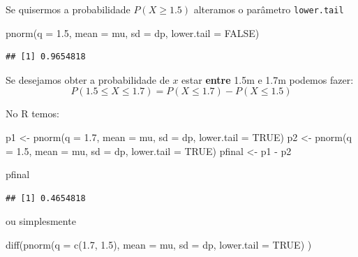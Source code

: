 \documentclass[
]{book}
\newenvironment{Shaded}{\begin{snugshade}}{\end{snugshade}}
\newcommand{\AttributeTok}[1]{\textcolor[rgb]{0.77,0.63,0.00}{#1}}
\newcommand{\ConstantTok}[1]{\textcolor[rgb]{0.00,0.00,0.00}{#1}}
\newcommand{\FloatTok}[1]{\textcolor[rgb]{0.00,0.00,0.81}{#1}}
\newcommand{\FunctionTok}[1]{\textcolor[rgb]{0.00,0.00,0.00}{#1}}
\newcommand{\NormalTok}[1]{#1}
\newcommand{\OtherTok}[1]{\textcolor[rgb]{0.56,0.35,0.01}{#1}}
\newcommand{\SpecialCharTok}[1]{\textcolor[rgb]{0.00,0.00,0.00}{#1}}
\begin{document}
Se quisermos a probabilidade \(P(X \ge 1.5)\) alteramos o parâmetro \texttt{lower.tail}

\begin{Shaded}
\begin{Highlighting}[]
\FunctionTok{pnorm}\NormalTok{(}\AttributeTok{q =} \FloatTok{1.5}\NormalTok{, }\AttributeTok{mean =}\NormalTok{ mu, }\AttributeTok{sd =}\NormalTok{ dp, }\AttributeTok{lower.tail =} \ConstantTok{FALSE}\NormalTok{)}
\end{Highlighting}
\end{Shaded}

\begin{verbatim}
## [1] 0.9654818
\end{verbatim}

Se desejamos obter a probabilidade de \(x\) estar \textbf{entre} 1.5m e 1.7m podemos fazer: \[P(1.5 \le X \le 1.7) = P(X \le 1.7) - P(X \le 1.5)\]

No R temos:

\begin{Shaded}
\begin{Highlighting}[]
\NormalTok{p1 }\OtherTok{\textless{}{-}} \FunctionTok{pnorm}\NormalTok{(}\AttributeTok{q =} \FloatTok{1.7}\NormalTok{, }\AttributeTok{mean =}\NormalTok{ mu, }\AttributeTok{sd =}\NormalTok{ dp, }\AttributeTok{lower.tail =} \ConstantTok{TRUE}\NormalTok{)}
\NormalTok{p2 }\OtherTok{\textless{}{-}} \FunctionTok{pnorm}\NormalTok{(}\AttributeTok{q =} \FloatTok{1.5}\NormalTok{, }\AttributeTok{mean =}\NormalTok{ mu, }\AttributeTok{sd =}\NormalTok{ dp, }\AttributeTok{lower.tail =} \ConstantTok{TRUE}\NormalTok{)}
\NormalTok{pfinal }\OtherTok{\textless{}{-}}\NormalTok{ p1 }\SpecialCharTok{{-}}\NormalTok{ p2}

\NormalTok{pfinal}
\end{Highlighting}
\end{Shaded}

\begin{verbatim}
## [1] 0.4654818
\end{verbatim}

ou simplesmente

\begin{Shaded}
\begin{Highlighting}[]
\FunctionTok{diff}\NormalTok{(}\FunctionTok{pnorm}\NormalTok{(}\AttributeTok{q =} \FunctionTok{c}\NormalTok{(}\FloatTok{1.7}\NormalTok{, }\FloatTok{1.5}\NormalTok{),}
           \AttributeTok{mean =}\NormalTok{ mu,}
           \AttributeTok{sd =}\NormalTok{ dp,}
           \AttributeTok{lower.tail =} \ConstantTok{TRUE}\NormalTok{)}
\NormalTok{     )}
\end{Highlighting}
\end{Shaded}
\end{document}
